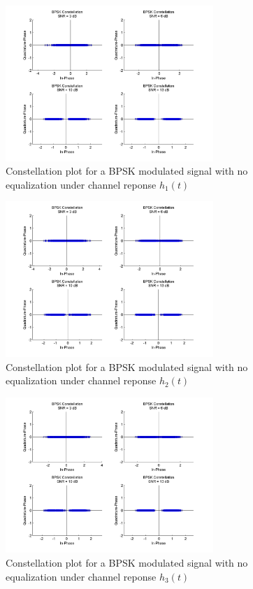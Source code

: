 \documentclass[]{article}
\begin{document}
\begin{figure}[H]
\centering
\includegraphics[width=0.7\textwidth]{bpConst1.jpg}
\caption{Constellation plot for a BPSK modulated signal with no equalization under channel reponse $h_1(t)$}
\end{figure}

\begin{figure}[H]
\centering
\includegraphics[width=0.7\textwidth]{bpConst2.jpg}
\caption{Constellation plot for a BPSK modulated signal with no equalization under channel reponse $h_2(t)$}
\end{figure}

\begin{figure}[H]
\centering
\includegraphics[width=0.7\textwidth]{bpConst3.jpg}
\caption{Constellation plot for a BPSK modulated signal with no equalization under channel reponse $h_3(t)$}
\end{figure}
\end{document}
